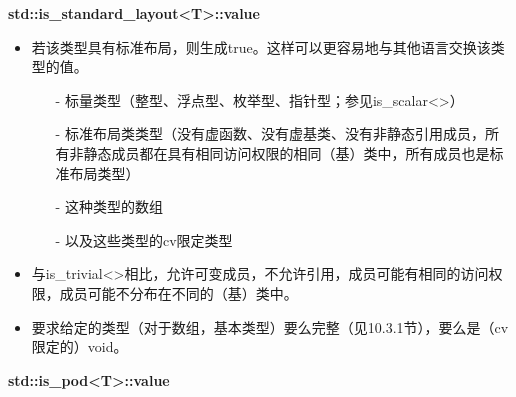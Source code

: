 \textbf{std::is\_standard\_layout<T>::value}

\begin{itemize}
\item 
若该类型具有标准布局，则生成true。这样可以更容易地与其他语言交换该类型的值。

\begin{itemize}
\item [-]
标量类型（整型、浮点型、枚举型、指针型；参见is\_scalar<>）

\item [-]
标准布局类类型（没有虚函数、没有虚基类、没有非静态引用成员，所有非静态成员都在具有相同访问权限的相同（基）类中，所有成员也是标准布局类型）

\item [-]
这种类型的数组

\item [-]
以及这些类型的cv限定类型
\end{itemize}

\item 
与is\_trivial<>相比，允许可变成员，不允许引用，成员可能有相同的访问权限，成员可能不分布在不同的（基）类中。

\item 
要求给定的类型（对于数组，基本类型）要么完整（见10.3.1节），要么是（cv限定的）void。
\end{itemize}

\textbf{std::is\_pod<T>::value}


